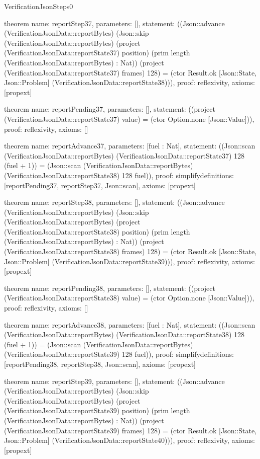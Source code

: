 \begin{lexlean}{VerificationJsonSteps0}
\begin{semanticmodule}
theorem{
  name: reportStep37,
  parameters: [],
  statement: ((Json::advance (VerificationJsonData::reportBytes) (Json::skip (VerificationJsonData::reportBytes) (project (VerificationJsonData::reportState37) position) (prim length (VerificationJsonData::reportBytes) : Nat)) (project (VerificationJsonData::reportState37) frames) 128) = (ctor Result.ok [Json::State, Json::Problem] (VerificationJsonData::reportState38))),
  proof: reflexivity{},
  axioms: [propext]
}

theorem{
  name: reportPending37,
  parameters: [],
  statement: ((project (VerificationJsonData::reportState37) value) = (ctor Option.none [Json::Value])),
  proof: reflexivity{},
  axioms: []
}

theorem{
  name: reportAdvance37,
  parameters: [fuel : Nat],
  statement: ((Json::scan (VerificationJsonData::reportBytes) (VerificationJsonData::reportState37) 128 (fuel + 1)) = (Json::scan (VerificationJsonData::reportBytes) (VerificationJsonData::reportState38) 128 fuel)),
  proof: simplify{definitions: [reportPending37, reportStep37, Json::scan]},
  axioms: [propext]
}

theorem{
  name: reportStep38,
  parameters: [],
  statement: ((Json::advance (VerificationJsonData::reportBytes) (Json::skip (VerificationJsonData::reportBytes) (project (VerificationJsonData::reportState38) position) (prim length (VerificationJsonData::reportBytes) : Nat)) (project (VerificationJsonData::reportState38) frames) 128) = (ctor Result.ok [Json::State, Json::Problem] (VerificationJsonData::reportState39))),
  proof: reflexivity{},
  axioms: [propext]
}

theorem{
  name: reportPending38,
  parameters: [],
  statement: ((project (VerificationJsonData::reportState38) value) = (ctor Option.none [Json::Value])),
  proof: reflexivity{},
  axioms: []
}

theorem{
  name: reportAdvance38,
  parameters: [fuel : Nat],
  statement: ((Json::scan (VerificationJsonData::reportBytes) (VerificationJsonData::reportState38) 128 (fuel + 1)) = (Json::scan (VerificationJsonData::reportBytes) (VerificationJsonData::reportState39) 128 fuel)),
  proof: simplify{definitions: [reportPending38, reportStep38, Json::scan]},
  axioms: [propext]
}

theorem{
  name: reportStep39,
  parameters: [],
  statement: ((Json::advance (VerificationJsonData::reportBytes) (Json::skip (VerificationJsonData::reportBytes) (project (VerificationJsonData::reportState39) position) (prim length (VerificationJsonData::reportBytes) : Nat)) (project (VerificationJsonData::reportState39) frames) 128) = (ctor Result.ok [Json::State, Json::Problem] (VerificationJsonData::reportState40))),
  proof: reflexivity{},
  axioms: [propext]
}


\end{semanticmodule}
\end{lexlean}
